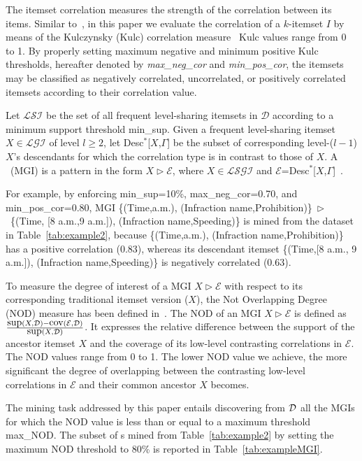 The itemset correlation measures the strength of the correlation between its items. Similar to~\cite{Flipping}, in this paper
we evaluate the correlation of a $k$-itemset $I$ by means of the Kulczynsky (Kulc) correlation measure~\cite{Wu2010Interestingness}
Kulc values range from 0 to 1. By properly setting maximum negative and minimum positive
Kulc thresholds, hereafter denoted by \textit{max\_neg\_cor} and \textit{min\_pos\_cor}, the itemsets may be classified as negatively correlated, uncorrelated, or positively correlated itemsets according to their correlation value.  

Let $\mathcal{LSI}$ be the set of all frequent level-sharing itemsets in $\mathcal{D}$ according to a minimum support threshold min\_sup. 
Given a frequent level-sharing itemset $X \in \mathcal{LGI}$ of level $l\geq2$, let 
Desc$^*$[$X$,$\Gamma$] be the subset of corresponding level-($l-1$) $X$'s descendants for which the correlation type is in contrast to those of $X$. 
A \MGI\ (MGI) is a pattern in the form $X \triangleright \mathcal{E}$, where $X \in \mathcal{LSGI}$ and $\mathcal{E}$=Desc$^*$[$X$,$\Gamma$]~\cite{MGI}. 

For example, by enforcing min\_sup=10\%, max\_neg\_cor=0.70, 
and min\_pos\_cor=0.80, MGI
\{(Time,a.m.), (Infraction name,Prohibition)\}~$\triangleright$~\{(Time, [8 a.m.,9 a.m.]), (Infraction name,Speeding)\} is 
mined from the dataset in Table~\ref{tab:example2}, 
because \{(Time,a.m.), (Infraction name,Prohibition)\} has a positive correlation (0.83), 
whereas its descendant itemset \{(Time,[8 a.m., 9 a.m.]), (Infraction name,Speeding)\} is negatively correlated (0.63).

To measure the degree of interest of a MGI $X \triangleright \mathcal{E}$ with respect to its corresponding traditional itemset version ($X$), 
the Not Overlapping Degree (NOD) measure has been defined in~\cite{MGI}. 
The NOD of an MGI $X \triangleright \mathcal{E}$ is defined as 
$\frac{\mbox{sup}(X,\cal{D})-\mbox{cov}(\mathcal{E},\cal{D})}{\mbox{sup}(X,\cal{D})}$.
It expresses the relative difference between the support of the ancestor itemset $X$ and the coverage of its low-level contrasting correlations in $\mathcal{E}$.
The NOD values range from 0 to 1. The lower NOD value we achieve, the more significant the degree of overlapping between 
the contrasting low-level correlations in $\mathcal{E}$ and their common ancestor $X$ becomes. 

The mining task addressed by this paper entails discovering from $\cal{D}$ all the MGIs for which
the NOD value is less than or equal to a maximum threshold max\_NOD. The subset of \MGI s mined from Table~\ref{tab:example2} by setting the maximum NOD threshold to 80\% is reported in Table~\ref{tab:exampleMGI}.





